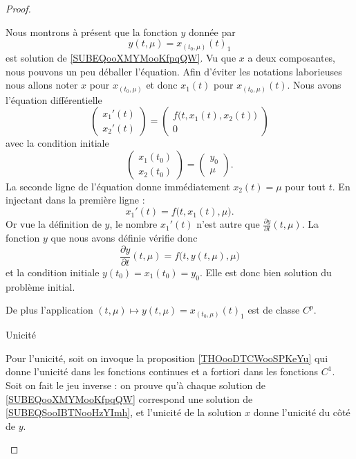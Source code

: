 \begin{proof}
\begin{subproof}
    Nous montrons à présent que la fonction \( y\) donnée par
    \begin{equation}
        y(t,\mu)=x_{(t_0,\mu)}(t)_1
    \end{equation}
    est solution de \eqref{SUBEQooXMYMooKfpqQW}. Vu que \( x\) a deux composantes, nous pouvons un peu déballer l'équation. Afin d'éviter les notations laborieuses nous allons noter \( x\) pour \( x_{(t_0,\mu)}\) et donc \( x_1(t)\) pour \( x_{(t_0,\mu)}(t)\). Nous avons l'équation différentielle
    \begin{equation}
        \begin{pmatrix}
            x_1'(t)    \\ 
            x_2'(t)    
        \end{pmatrix}=\begin{pmatrix}
            f\big( t,x_1(t),x_2(t) \big)    \\ 
            0    
        \end{pmatrix}
    \end{equation}
    avec la condition initiale
    \begin{equation}
        \begin{pmatrix}
            x_1(t_0)    \\ 
            x_2(t_0)    
        \end{pmatrix}=\begin{pmatrix}
            y_0    \\ 
            \mu    
        \end{pmatrix}.
    \end{equation}
    La seconde ligne de l'équation donne immédiatement \( x_2(t)=\mu\) pour tout \( t\). En injectant dans la première ligne :
    \begin{equation}
        x_1'(t)=f\big( t,x_1(t),\mu \big).
    \end{equation}
    Or vue la définition de \( y\), le nombre \( x_1'(t)\) n'est autre que \( \frac{ \partial y }{ \partial t }(t,\mu)\). La fonction \( y\) que nous avons définie vérifie donc
    \begin{equation}
        \frac{ \partial y }{ \partial t }(t,\mu)=f\big( t,y(t,\mu),\mu \big)
    \end{equation}
    et la condition initiale \( y(t_0)=x_1(t_0)=y_0\). Elle est donc bien solution du problème initial.

    De plus l'application \( (t,\mu)\mapsto y(t,\mu)=x_{(t_0,\mu)}(t)_1\) est de classe \( C^p\).
    
    \item[Unicité]

        Pour l'unicité, soit on invoque la proposition \ref{THOooDTCWooSPKeYu} qui donne l'unicité dans les fonctions continues et a fortiori dans les fonctions \( C^1\). Soit on fait le jeu inverse : on prouve qu'à chaque solution de \eqref{SUBEQooXMYMooKfpqQW} correspond une solution de \eqref{SUBEQSooIBTNooHzYImh}, et l'unicité de la solution \( x\) donne l'unicité du côté de \( y\).
    \end{subproof}
\end{proof}

